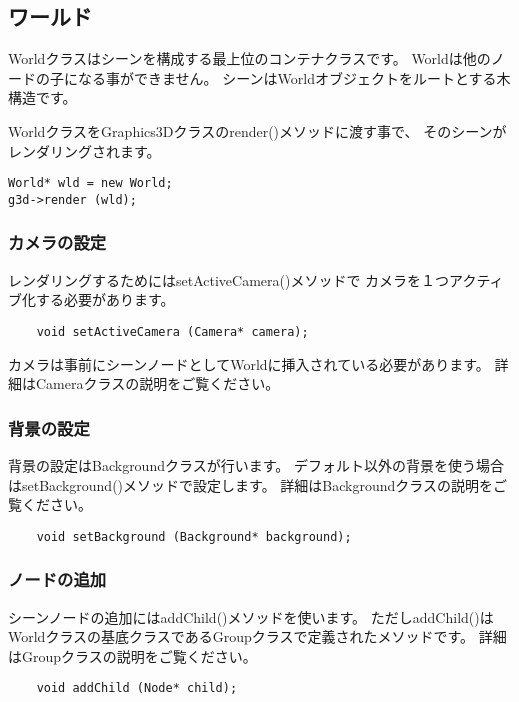 \subsection{ワールド}

Worldクラスはシーンを構成する最上位のコンテナクラスです。
Worldは他のノードの子になる事ができません。
シーンはWorldオブジェクトをルートとする木構造です。

WorldクラスをGraphics3Dクラスのrender()メソッドに渡す事で、
そのシーンがレンダリングされます。

\begin{verbatim}
World* wld = new World;
g3d->render (wld);
\end{verbatim}

\subsubsection{カメラの設定}

レンダリングするためにはsetActiveCamera()メソッドで
カメラを１つアクティブ化する必要があります。

\begin{verbatim}
    void setActiveCamera (Camera* camera);
\end{verbatim}

カメラは事前にシーンノードとしてWorldに挿入されている必要があります。
詳細はCameraクラスの説明をご覧ください。

\subsubsection{背景の設定}

背景の設定はBackgroundクラスが行います。
デフォルト以外の背景を使う場合はsetBackground()メソッドで設定します。
詳細はBackgroundクラスの説明をご覧ください。

\begin{verbatim}
    void setBackground (Background* background);
\end{verbatim}


\subsubsection{ノードの追加}

シーンノードの追加にはaddChild()メソッドを使います。
ただしaddChild()はWorldクラスの基底クラスであるGroupクラスで定義されたメソッドです。
詳細はGroupクラスの説明をご覧ください。

\begin{verbatim}
    void addChild (Node* child);
\end{verbatim}







